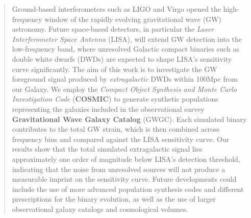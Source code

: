\begin{abstract}
Ground-based interferometers such as LIGO and Virgo opened the high-frequency window of the rapidly evolving gravitational wave (GW) astronomy.
Future space-based detectors, in particular the \textit{Laser Interferometer Space Antenna} (LISA), will extend GW detection into the low-frequency band, where unresolved Galactic compact binaries such as double white dwarfs (DWDs) are expected to shape LISA's sensitivity curve significantly.
The aim of this work is to investigate the GW foreground {signal} produced by \textit{extragalactic} DWDs within 100Mpc from our Galaxy.
We employ the \textit{Compact Object Synthesis and Monte Carlo Investigation Code} (\textbf{COSMIC}) to generate synthetic populations representing the galaxies included in the observational survey \textbf{Gravitational Wave Galaxy Catalog} (GWGC).
Each simulated binary contributes to the total GW strain, which is then combined across frequency bins and compared against the LISA sensitivity curve.
{Our} results show that the total simulated extragalactic signal lies approximately one order of magnitude below LISA’s detection threshold, indicating that the noise from unresolved sources will not produce a measurable imprint on the sensitivity curve.
Future developments could include the use of more advanced population synthesis codes and different prescriptions for the binary evolution, as well as the use of larger observational galaxy catalogs and cosmological volumes.
\end{abstract}
